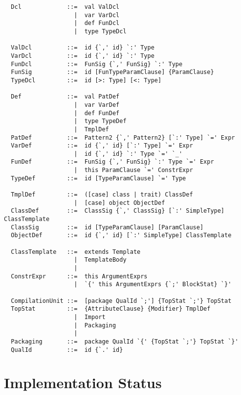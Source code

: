 \begin{lstlisting}
  Dcl             ::=  val ValDcl
                    |  var VarDcl
                    |  def FunDcl
                    |  type TypeDcl

  ValDcl          ::=  id {`,' id} `:' Type
  VarDcl          ::=  id {`,' id} `:' Type
  FunDcl          ::=  FunSig {`,' FunSig} `:' Type
  FunSig          ::=  id [FunTypeParamClause] {ParamClause}
  TypeDcl         ::=  id [>: Type] [<: Type]

  Def             ::=  val PatDef
                    |  var VarDef
                    |  def FunDef
                    |  type TypeDef
                    |  TmplDef
  PatDef          ::=  Pattern2 {`,' Pattern2} [`:' Type] `=' Expr
  VarDef          ::=  id {`,' id} [`:' Type] `=' Expr
                    |  id {`,' id} `:' Type `=' `_'
  FunDef          ::=  FunSig {`,' FunSig} `:' Type `=' Expr
                    |  this ParamClause `=' ConstrExpr
  TypeDef         ::=  id [TypeParamClause] `=' Type

  TmplDef         ::=  ([case] class | trait) ClassDef
                    |  [case] object ObjectDef
  ClassDef        ::=  ClassSig {`,' ClassSig} [`:' SimpleType] ClassTemplate
  ClassSig        ::=  id [TypeParamClause] [ParamClause]
  ObjectDef       ::=  id {`,' id} [`:' SimpleType] ClassTemplate

  ClassTemplate   ::=  extends Template
                    |  TemplateBody
                    |
  ConstrExpr      ::=  this ArgumentExprs
                    |  `{' this ArgumentExprs {`;' BlockStat} `}'

  CompilationUnit ::=  [package QualId `;'] {TopStat `;'} TopStat
  TopStat         ::=  {AttributeClause} {Modifier} TmplDef
                    |  Import
                    |  Packaging
                    |
  Packaging       ::=  package QualId `{' {TopStat `;'} TopStat `}'
  QualId          ::=  id {`.' id}
\end{lstlisting}

\chapter{Implementation Status}





